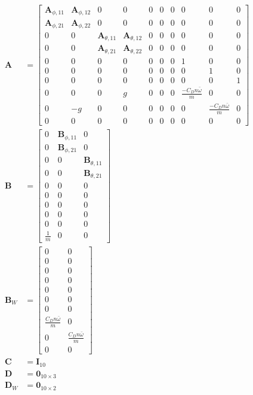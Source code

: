 \begin{align}
\mathbf{A} &= \begin{bmatrix}
\mathbf{A}_{\phi,11} & \mathbf{A}_{\phi,12} & 0 & 0 & 0 & 0 & 0 & 0 & 0 & 0 \\
\mathbf{A}_{\phi,21} & \mathbf{A}_{\phi,22} & 0 & 0 & 0 & 0 & 0 & 0 & 0 & 0 \\
0 & 0 & \mathbf{A}_{\theta,11} & \mathbf{A}_{\theta,12} & 0 & 0 & 0 & 0 & 0 & 0  \\
0 & 0 & \mathbf{A}_{\theta,21} & \mathbf{A}_{\theta,22} & 0 & 0 & 0 & 0 & 0 & 0  \\
0 & 0 & 0 & 0 & 0 & 0 & 0 & 1 & 0 & 0 \\
0 & 0 & 0 & 0 & 0 & 0 & 0 & 0 & 1 & 0 \\
0 & 0 & 0 & 0 & 0 & 0 & 0 & 0 & 0 & 1 \\
0 & 0 & 0 & g & 0 & 0 & 0 & \frac{-C_D n \bar{\omega}}{m} & 0 & 0 \\
0 & -g & 0 & 0 & 0 & 0 & 0 & 0 & \frac{-C_D n \bar{\omega}}{m} & 0 \\
0 & 0 & 0 & 0 & 0 & 0 & 0 & 0 & 0 & 0 
\end{bmatrix} \label{eq:system_matrix}\\
\mathbf{B} &= \begin{bmatrix}
0 & \mathbf{B}_{\phi,11} & 0 \\
0 & \mathbf{B}_{\phi,21} & 0 \\
0 & 0 & \mathbf{B}_{\theta,11} \\
0 & 0 & \mathbf{B}_{\theta,21} \\
0 & 0 & 0 \\
0 & 0 & 0 \\
0 & 0 & 0 \\
0 & 0 & 0 \\
0 & 0 & 0 \\
\frac{1}{m} & 0 & 0
\end{bmatrix} \\
\mathbf{B}_W &= \begin{bmatrix}
0 & 0 \\
0 & 0 \\
0 & 0 \\
0 & 0 \\
0 & 0 \\
0 & 0 \\
0 & 0 \\
\frac{C_D n \bar{\omega}}{m} & 0 \\
0 & \frac{C_D n \bar{\omega}}{m} \\
0 & 0
\end{bmatrix} \\
\mathbf{C} &= \mathbf{I}_{10} \\
\mathbf{D} &= \mathbf{0}_{10\times3} \\
\mathbf{D}_W &= \mathbf{0}_{10\times2}
\end{align}

